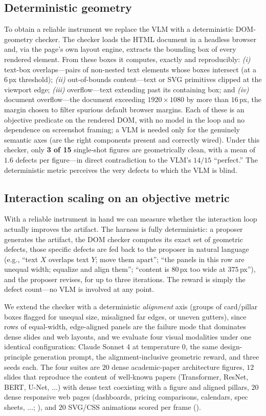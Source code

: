 \subsection{Deterministic geometry}

To obtain a reliable instrument we replace the VLM with a deterministic
DOM-geometry checker. The checker loads the HTML document in a headless browser
and, via the page's own layout engine, extracts the bounding box of every
rendered element. From these boxes it computes, exactly and reproducibly:
\emph{(i)} text-box overlaps---pairs of non-nested text elements whose boxes
intersect (at a $6$\,px threshold); \emph{(ii)} out-of-bounds content---text or
SVG primitives clipped at the viewport edge; \emph{(iii)} overflow---text
extending past its containing box; and \emph{(iv)} document overflow---the
document exceeding $1920\times1080$ by more than $16$\,px, the margin chosen to
filter spurious default browser margins. Each of these is an objective predicate
on the rendered DOM, with no model in the loop and no dependence on screenshot
framing; a VLM is needed only for the genuinely semantic axes (are the right
components present and correctly wired). Under this checker, only \textbf{3 of
15} single-shot figures are geometrically clean, with a mean of $1.6$ defects per
figure---in direct contradiction to the VLM's $14/15$ ``perfect.'' The
deterministic metric perceives the very defects to which the VLM is blind.

\subsection{Interaction scaling on an objective metric}

With a reliable instrument in hand we can measure whether the interaction loop
actually improves the artifact. The harness is fully deterministic: a proposer
generates the artifact, the DOM checker computes its exact set of geometric
defects, those specific defects are fed back to the proposer in natural language
(e.g., ``text $X$ overlaps text $Y$; move them apart''; ``the panels in this row
are unequal width; equalize and align them''; ``content is $80$\,px too wide at
$375$\,px''), and the proposer revises, for up to three iterations. The reward is
simply the defect count---no VLM is involved at any point.

We extend the checker with a deterministic \emph{alignment} axis (groups of
card/pillar boxes flagged for unequal size, misaligned far edges, or uneven
gutters), since rows of equal-width, edge-aligned panels are the failure mode that
dominates dense slides and web layouts, and we evaluate four visual modalities
under one identical configuration: Claude Sonnet 4 at temperature $0$, the same
design-principle generation prompt, the alignment-inclusive geometric reward, and
three seeds each. The four suites are $20$ dense academic-paper architecture
figures, $12$ slides that reproduce the content of well-known papers
(Transformer, ResNet, BERT, U-Net, $\dots$) with dense text coexisting with a
figure and aligned pillars, $20$ dense responsive web pages (dashboards,
pricing comparisons, calendars, spec sheets, $\dots$; ),
and $20$ SVG/CSS animations scored per frame ().

